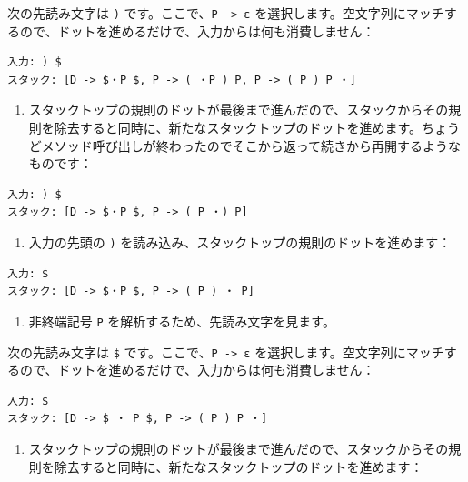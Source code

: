 次の先読み文字は \texttt{)} です。ここで、\texttt{P\ -\textgreater{}\ ε}
を選択します。空文字列にマッチするので、ドットを進めるだけで、入力からは何も消費しません：

\begin{verbatim}
入力: ) $
スタック: [D -> $・P $, P -> ( ・P ) P, P -> ( P ) P ・]
\end{verbatim}

\begin{enumerate}
\def\labelenumi{\arabic{enumi}.}
\setcounter{enumi}{8}
\tightlist
\item
  スタックトップの規則のドットが最後まで進んだので、スタックからその規則を除去すると同時に、新たなスタックトップのドットを進めます。ちょうどメソッド呼び出しが終わったのでそこから返って続きから再開するようなものです：
\end{enumerate}

\begin{verbatim}
入力: ) $
スタック: [D -> $・P $, P -> ( P ・) P]
\end{verbatim}

\begin{enumerate}
\def\labelenumi{\arabic{enumi}.}
\setcounter{enumi}{9}
\tightlist
\item
  入力の先頭の \texttt{)}
  を読み込み、スタックトップの規則のドットを進めます：
\end{enumerate}

\begin{verbatim}
入力: $
スタック: [D -> $・P $, P -> ( P ) ・ P]
\end{verbatim}

\begin{enumerate}
\def\labelenumi{\arabic{enumi}.}
\setcounter{enumi}{10}
\tightlist
\item
  非終端記号 \texttt{P} を解析するため、先読み文字を見ます。
\end{enumerate}

次の先読み文字は \texttt{\$}
です。ここで、\texttt{P\ -\textgreater{}\ ε}
を選択します。空文字列にマッチするので、ドットを進めるだけで、入力からは何も消費しません：

\begin{verbatim}
入力: $
スタック: [D -> $ ・ P $, P -> ( P ) P ・]
\end{verbatim}

\begin{enumerate}
\def\labelenumi{\arabic{enumi}.}
\setcounter{enumi}{11}
\tightlist
\item
  スタックトップの規則のドットが最後まで進んだので、スタックからその規則を除去すると同時に、新たなスタックトップのドットを進めます：
\end{enumerate}

